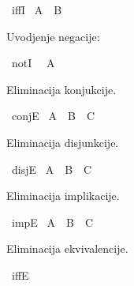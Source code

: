 \begin{isabellebody}
\begin{exercise}[subtitle=Intuicionistička pravila prirodne dedukcije iskazne logike.]
\ iffI\isanewline
\isanewline
{}\isamarkupfalse%
\ {\isachardoublequoteopen}A\ {\isasymlongleftrightarrow}\ B{\isachardoublequoteclose}\isanewline
\ \ %
\isadelimproof
%
\endisadelimproof
%
\isatagproof
%
\endisatagproof
{\isafoldproof}%
%
\isadelimproof
%
\endisadelimproof
%
\begin{isamarkuptext}%
Uvodjenje negacije: %
\end{isamarkuptext}\isamarkuptrue%
\isamarkupfalse%
\ notI\isanewline
\isanewline
{}\isamarkupfalse%
\ {\isachardoublequoteopen}{\isasymnot}\ A{\isachardoublequoteclose}\isanewline
\ \ %
\isadelimproof
%
\endisadelimproof
%
\isatagproof
%
\endisatagproof
{\isafoldproof}%
%
\isadelimproof
%
\endisadelimproof
%
\begin{isamarkuptext}%
Eliminacija konjukcije. %
\end{isamarkuptext}\isamarkuptrue%
\isamarkupfalse%
\ conjE\isanewline
\isanewline
{}\isamarkupfalse%
\ {\isachardoublequoteopen}A\ {\isasymand}\ B\ {\isasymLongrightarrow}\ C{\isachardoublequoteclose}\isanewline
\ \ %
\isadelimproof
%
\endisadelimproof
%
\isatagproof
%
\endisatagproof
{\isafoldproof}%
%
\isadelimproof
%
\endisadelimproof
%
\begin{isamarkuptext}%
Eliminacija disjunkcije. %
\end{isamarkuptext}\isamarkuptrue%
\isamarkupfalse%
\ disjE\isanewline
\isanewline
{}\isamarkupfalse%
\ {\isachardoublequoteopen}A\ {\isasymor}\ B\ {\isasymLongrightarrow}\ C{\isachardoublequoteclose}\isanewline
\ \ %
\isadelimproof
%
\endisadelimproof
%
\isatagproof
%
\endisatagproof
{\isafoldproof}%
%
\isadelimproof
%
\endisadelimproof
%
\begin{isamarkuptext}%
Eliminacija implikacije. %
\end{isamarkuptext}\isamarkuptrue%
\isamarkupfalse%
\ impE\isanewline
\isanewline
{}\isamarkupfalse%
\ {\isachardoublequoteopen}A\ {\isasymlongrightarrow}\ B\ {\isasymLongrightarrow}\ C{\isachardoublequoteclose}\isanewline
\ \ %
\isadelimproof
%
\endisadelimproof
%
\isatagproof
%
\endisatagproof
{\isafoldproof}%
%
\isadelimproof
%
\endisadelimproof
%
\begin{isamarkuptext}%
Eliminacija ekvivalencije. %
\end{isamarkuptext}\isamarkuptrue%
\isamarkupfalse%
\ iffE\isanewline
\isanewline
{}\isamarkupfalse%

\end{exercise}
\end{isabellebody}
